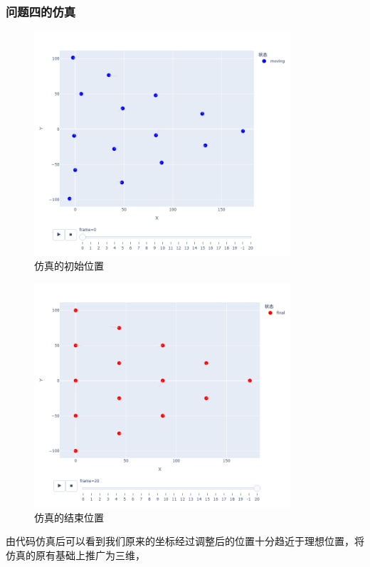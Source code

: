 \documentclass[withoutpreface,bwprint]{cumcmthesis} %
\begin{document}
\subsubsection{问题四的仿真}
\begin{figure}[H]
    \centering
    \includegraphics[width=0.85\textwidth]{../../figure/start_4.png} 
    \caption{仿真的初始位置}
    \label{q4_2}    
\end{figure}
\begin{figure}[H]
    \centering
    \includegraphics[width=0.85\textwidth]{../../figure/end_4.png} 
    \caption{仿真的结束位置}
    \label{q4_2}    
\end{figure}
由代码仿真后可以看到我们原来的坐标经过调整后的位置十分趋近于理想位置，将仿真的原有基础上推广为三维，
\end{document}
